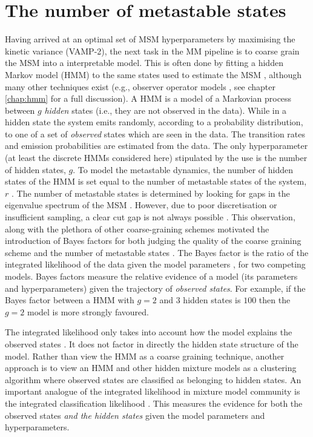 \section{The number of metastable states}
Having arrived at an optimal set of MSM hyperparameters by maximising the kinetic variance (VAMP-2), the next task in the MM pipeline is to coarse grain the MSM into a interpretable model. This is often done by fitting a hidden Markov model (HMM) to the same states used to estimate the MSM \cite{noeMarkovModelsMolecular2019b}, although many other techniques exist (e.g., observer operator models \cite{wuProjectedMetastableMarkov2015}, see chapter \ref{chap:hmm} for a full discussion). A HMM is a model of a Markovian process between $g$ \emph{hidden} states (i.e., they are not observed in the data). While in a hidden state the system emits randomly, according to a probability distribution, to one of a set of \emph{observed} states which are seen in the data. The transition rates and emission probabilities are estimated from the data.  The only hyperparameter (at least the discrete HMMs considered here) stipulated by the use is the number of hidden states, $g$. To model the metastable dynamics, the number of hidden states of the HMM is set equal to the number of metastable states of the system, $r$ \cite{noeProjectedHiddenMarkov2013a}. The number of metastable states is determined by looking for gaps in the eigenvalue spectrum of the MSM \cite{prinzMarkovModelsMolecular2011}\cite{noeProjectedHiddenMarkov2013a}. However, due to poor discretisation or insufficient sampling, a clear cut gap is not always possible \cite{bowmanQuantitativeComparisonAlternative2013}. This observation, along with the plethora of other coarse-graining schemes motivated the introduction of Bayes factors \cite{kassBayesFactors1995} for both judging the quality of the coarse graining scheme and the number of metastable states \cite{bacalladoBayesianComparisonMarkov2009a}. The Bayes factor is the ratio of the integrated likelihood of the data given the model parameters \cite{kassBayesFactors1995}, for two competing models. Bayes factors measure the relative evidence of a model (its parameters and hyperparameters) given the trajectory of \emph{observed states}. For example, if the Bayes factor between a HMM with $g=2$ and  $3$ hidden states is $100$ then the $g=2$ model is more strongly favoured. 

The integrated likelihood only takes into account how the model explains the observed states \cite{biernackiAssessingMixtureModel2000a}\cite{mclachlanFiniteMixtureModels2000}. It does not factor in directly the hidden state structure of the model. Rather than view the HMM as a coarse graining technique, another approach is to view an HMM and other hidden mixture models as a clustering algorithm \cite{mclachlanFiniteMixtureModels2000} where observed states are classified as belonging to hidden states. An important analogue of the integrated likelihood in mixture model community is the integrated classification likelihood \cite{mclachlanFiniteMixtureModels2000}. This measures the evidence for  both the observed states \emph{and the hidden states} given the model parameters and hyperparameters. 

